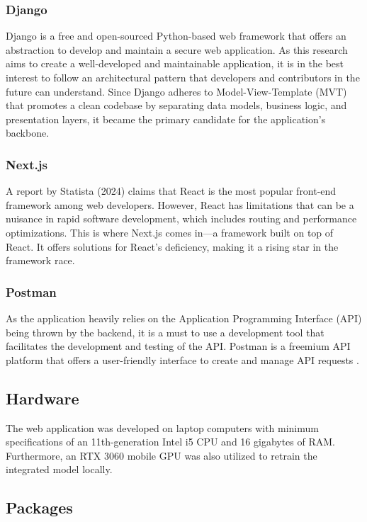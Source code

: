 \subsubsection{Django}
Django is a free and open-sourced Python-based web framework that offers an abstraction to develop and maintain a secure web application. As this research aims to create a well-developed and maintainable application, it is in the best interest to follow an architectural pattern that developers and contributors in the future can understand. Since Django adheres to Model-View-Template (MVT) that promotes a clean codebase by separating data models, business logic, and presentation layers, it became the primary candidate for the application's backbone. 


\subsubsection{Next.js}
A report by Statista (2024) claims that React is the most popular front-end framework among web developers. However, React has limitations that can be a nuisance in rapid software development, which includes routing and performance optimizations. This is where Next.js comes in—a framework built on top of React. It offers solutions for React's deficiency, making it a rising star in the framework race. 

\subsubsection{Postman}
As the application heavily relies on the Application Programming Interface (API) being thrown by the backend, it is a must to use a development tool that facilitates the development and testing of the API. Postman is a freemium API platform that offers a user-friendly interface to create and manage API requests \cite{postman-no-date}. 

\subsection{Hardware}
The web application was developed on laptop computers with minimum specifications of an 11th-generation Intel i5 CPU and 16 gigabytes of RAM. Furthermore, an RTX 3060 mobile GPU was also utilized to retrain the integrated model locally. 

\subsection{Packages}

